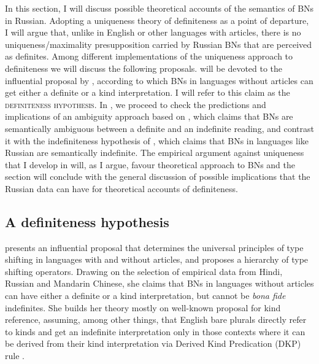 \documentclass[output=paper,colorlinks,citecolor=brown]{langscibook}
\begin{document}
In this section, I will discuss possible theoretical accounts of the semantics of BNs in Russian. Adopting a uniqueness theory of definiteness as a point of departure, I will argue that, 
unlike in English or other languages with articles, there is no uniqueness/maximality presupposition carried by Russian BNs that are perceived as definites. Among different implementations of the uniqueness approach to definiteness we will discuss the following proposals.  will be devoted to the influential proposal by \citet{dayal04}, according to which BNs in languages without articles can get either a definite or a kind interpretation. I will refer to this claim as the \textsc{definiteness hypothesis}. In , we proceed to check the predictions and implications of an ambiguity approach based on \citet{chierchia98}, which claims that BNs are semantically ambiguous between a definite and an indefinite reading, and contrast it with the indefiniteness hypothesis of \citet{Heim2011}, which claims that BNs in languages like Russian are semantically indefinite. The empirical argument against uniqueness that I develop in  will, as I argue, favour  theoretical approach to BNs and the section will conclude with the general discussion of possible implications that the Russian data can have for theoretical accounts of definiteness.  


\subsection{A definiteness hypothesis} \label{defhypothesis}

\citet{dayal04} presents an influential proposal that determines the universal principles of type shifting in languages with and without articles, and proposes a hierarchy of type shifting operators. Drawing on the selection of empirical data from Hindi, Russian and Mandarin Chinese, she claims that BNs in languages without articles can have either a definite or a kind interpretation, but cannot be \textit{bona fide} indefinites. She builds her theory mostly on  well-known proposal for kind reference, assuming, among other things, that English bare plurals directly refer to kinds and get an indefinite interpretation only in those contexts where it can be derived from their kind interpretation via Derived Kind Predication (DKP) rule  \citep[cf.][364]{chierchia98}. 
\end{document}
